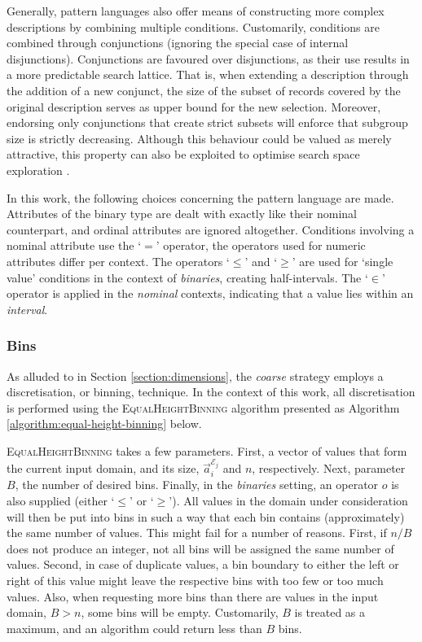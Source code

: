 \documentclass[smallextended]{svjour3}
\newcommand{\op}[1]{`$#1$'}
\newcommand{\extension}[1]{\mathcal{E}_{#1}}
\newcommand{\parameter}{\emph}
\newcommand{\binaries}{\parameter{binaries}}
\newcommand{\nominal}{\parameter{nominal}}
\newcommand{\coarse}{\parameter{coarse}}
\newcommand{\eh}{\textsc{EqualHeightBinning}}
\begin{document}
Generally, pattern languages also offer means of constructing more complex descriptions by combining multiple conditions.
Customarily, conditions are combined through conjunctions (ignoring the special case of internal disjunctions).
Conjunctions are favoured over disjunctions, as their use results in a more predictable search lattice.
That is, when extending a description through the addition of a new conjunct, the size of the subset of records covered by the original description serves as upper bound for the new selection.
Moreover, endorsing only conjunctions that create strict subsets will enforce that subgroup size is strictly decreasing.
Although this behaviour could be valued as merely attractive, this property can also be exploited to optimise search space exploration \cite{atzmueller:2009:ismis,boley:2017,grosskreutz:2009,lemmerich:2012}.

In this work, the following choices concerning the pattern language are made.
Attributes of the binary type are dealt with exactly like their nominal counterpart, and ordinal attributes are ignored altogether.
Conditions involving a nominal attribute use the \op{=} operator, the operators used for numeric attributes differ per context.
The operators \op{\leq} and \op{\geq} are used for `single value' conditions in the context of \binaries{}, creating half-intervals.
The \op{\in} operator is applied in the \nominal{} contexts, indicating that a value lies within an \emph{interval}.


\subsubsection{Bins}
\label{section:bins}

As alluded to in Section \ref{section:dimensions}, the \coarse{} strategy employs a discretisation, or binning, technique.
In the context of this work, all discretisation is performed using the \eh{} algorithm presented as Algorithm \ref{algorithm:equal-height-binning} below.

\eh{} takes a few parameters.
First, a vector of values that form the current input domain, and its size, $\vec{a}_i^{\extension{j}}$ and $n$, respectively.
Next, parameter $B$, the number of desired bins.
Finally, in the \binaries{} setting, an operator $o$ is also supplied (either \op{\leq} or \op{\geq}).
All values in the domain under consideration will then be put into bins in such a way that each bin contains (approximately) the same number of values.
This might fail for a number of reasons.
First, if $n/B$ does not produce an integer, not all bins will be assigned the same number of values.
Second, in case of duplicate values, a bin boundary to either the left or right of this value might leave the respective bins with too few or too much values.
Also, when requesting more bins than there are values in the input domain, $B > n$, some bins will be empty.
Customarily, $B$ is treated as a maximum, and an algorithm could return less than $B$ bins.
\end{document}
